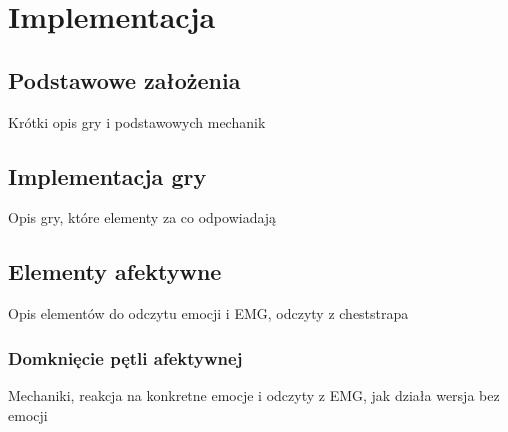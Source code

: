 \chapter{Implementacja}
\label{cha:implementacja}
\section{Podstawowe założenia}
Krótki opis gry i podstawowych mechanik
\section{Implementacja gry}
Opis gry, które elementy za co odpowiadają
\section{Elementy afektywne}
Opis elementów do odczytu emocji i EMG, odczyty z cheststrapa

\subsection{Domknięcie pętli afektywnej}
Mechaniki, reakcja na konkretne emocje i odczyty z EMG, jak działa wersja bez emocji